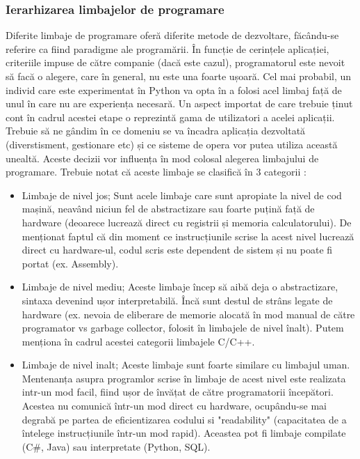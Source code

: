 \documentclass[a4paper,12pt]{report}
\begin{document}
  	\subsubsection{Ierarhizarea limbajelor de programare}
  	Diferite limbaje de programare oferă diferite metode de dezvoltare, făcându-se referire ca fiind paradigme ale programării. În funcție de cerințele aplicației, criteriile impuse de către companie (dacă este cazul), programatorul este nevoit să facă o alegere, care în general, nu este una foarte ușoară. Cel mai probabil, un individ care este experimentat în Python va opta în a folosi acel limbaj față de unul în care nu are experiența necesară. Un aspect importat de care trebuie ținut cont în cadrul acestei etape o reprezintă gama de utilizatori a acelei aplicații. Trebuie să ne gândim în ce domeniu se va încadra aplicația dezvoltată (diverstisment, gestionare etc) și ce sisteme de opera vor putea utiliza această unealtă. Aceste decizii vor influența în mod colosal alegerea limbajului de programare. Trebuie notat că aceste limbaje se clasifică în 3 categorii \cite{lang_clas}: 
  	\begin{itemize}
  		\item Limbaje de nivel jos; Sunt acele limbaje care sunt apropiate la nivel de cod mașină, neavând niciun fel de abstractizare sau foarte puțină față de hardware (deoarece lucrează direct cu registrii și memoria calculatorului). De menționat faptul că din moment ce instrucțiunile scrise la acest nivel lucrează direct cu hardware-ul, codul scris este dependent de sistem și nu poate fi portat (ex. Assembly).
  		\item Limbaje de nivel mediu; Aceste limbaje încep să aibă deja o abstractizare, sintaxa devenind ușor interpretabilă. Încă sunt destul de strâns legate de hardware (ex. nevoia de eliberare de memorie alocată în mod manual de către programator vs garbage collector, folosit în limbajele de nivel înalt). Putem menționa în cadrul acestei categorii limbajele C/C++.
  		\item Limbaje de nivel inalt; Aceste limbaje sunt foarte similare cu limbajul uman. Mentenanța asupra programlor scrise în limbaje de acest nivel este realizata intr-un mod facil, fiind ușor de învățat de către programatorii începători. Acestea nu comunică într-un mod direct cu hardware, ocupându-se mai degrabă pe partea de eficientizarea codului si "readability" (capacitatea de a întelege instrucțiunile într-un mod rapid). Aceastea pot fi limbaje compilate (C\#, Java) sau interpretate (Python, SQL).
  	\end{itemize}
  
\end{document}
